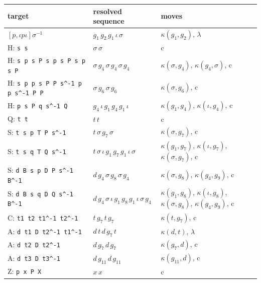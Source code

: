 \begin{center}\footnotesize
\begin{tabular}{@{}p{}p{}p{}@{}}
\toprule
target & resolved sequence & moves \\
\midrule
$[p,\iota p\iota]\sigma^{-1}$ & $g_{1}\,g_{2}\,g_{1}\,\iota\,\sigma$ & $\kappa(g_{1},g_{2})$, $\lambda$ \\
H: \texttt{s s} & $\sigma\,\sigma$ & c \\
H: \texttt{s p s P s p s P s p s P} & $\sigma\,g_{4}\,\sigma\,g_{4}\,\sigma\,g_{4}$ & $\kappa(\sigma,g_{4})$, $\kappa(g_{4},\sigma)$, c \\
\raggedright H: \texttt{s p p s P P s\textasciicircum{}-1 p p s\textasciicircum{}-1 P P} & $\sigma\,g_{6}\,\sigma\,g_{6}$ & $\kappa(\sigma,g_{6})$, c \\
H: \texttt{p s P q s\textasciicircum{}-1 Q} & $g_{4}\,\iota\,g_{1}\,g_{4}\,g_{1}\,\iota$ & $\kappa(g_{1},g_{4})$, $\kappa(\iota,g_{4})$, c \\
Q: \texttt{t t} & $t\,t$ & c \\
S: \texttt{t s p T P s\textasciicircum{}-1} & $t\,\sigma\,g_{7}\,\sigma$ & $\kappa(\sigma,g_{7})$, c \\
S: \texttt{t s q T Q s\textasciicircum{}-1} & $t\,\sigma\,\iota\,g_{1}\,g_{7}\,g_{1}\,\iota\,\sigma$ & $\kappa(g_{1},g_{7})$, $\kappa(\iota,g_{7})$, $\kappa(\sigma,g_{7})$, c \\
S: \texttt{d B s p D P s\textasciicircum{}-1 B\textasciicircum{}-1} & $d\,g_{4}\,\sigma\,g_{8}\,\sigma\,g_{4}$ & $\kappa(\sigma,g_{8})$, $\kappa(g_{4},g_{9})$, c \\
S: \texttt{d B s q D Q s\textasciicircum{}-1 B\textasciicircum{}-1} & $d\,g_{4}\,\sigma\,\iota\,g_{1}\,g_{8}\,g_{1}\,\iota\,\sigma\,g_{4}$ & $\kappa(g_{1},g_{8})$, $\kappa(\iota,g_{8})$, $\kappa(\sigma,g_{8})$, $\kappa(g_{4},g_{9})$, c \\
C: \texttt{t1 t2 t1\textasciicircum{}-1 t2\textasciicircum{}-1} & $t\,g_{7}\,t\,g_{7}$ & $\kappa(t,g_{7})$, c \\
A: \texttt{d t1 D t2\textasciicircum{}-1 t1\textasciicircum{}-1} & $d\,t\,d\,g_{7}\,t$ & $\kappa(d,t)$, $\lambda$ \\
A: \texttt{d t2 D t2\textasciicircum{}-1} & $d\,g_{7}\,d\,g_{7}$ & $\kappa(g_{7},d)$, c \\
A: \texttt{d t3 D t3\textasciicircum{}-1} & $d\,g_{11}\,d\,g_{11}$ & $\kappa(g_{11},d)$, c \\
Z: \texttt{p x P X} & $x\,x$ & c \\

\end{tabular}
\end{center}
